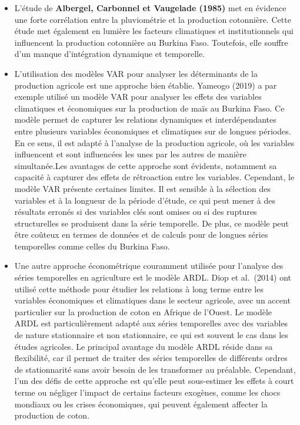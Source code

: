 \documentclass[
  letterpaper,
  DIV=11,
  numbers=noendperiod]{scrartcl}
\begin{document}
\begin{itemize}
\item
  L'étude de \textbf{Albergel, Carbonnel et Vaugelade (1985)} met en
  évidence une forte corrélation entre la pluviométrie et la production
  cotonnière. Cette étude met également en lumière les facteurs
  climatiques et institutionnels qui influencent la production
  cotonnière au Burkina Faso. Toutefois, elle souffre d'un manque
  d'intégration dynamique et temporelle.
\item
  L'utilisation des modèles VAR pour analyser les déterminants de la
  production agricole est une approche bien établie. Yameogo (2019) a
  par exemple utilisé un modèle VAR pour analyser les effets des
  variables climatiques et économiques sur la production de maïs au
  Burkina Faso. Ce modèle permet de capturer les relations dynamiques et
  interdépendantes entre plusieurs variables économiques et climatiques
  sur de longues périodes. En ce sens, il est adapté à l'analyse de la
  production agricole, où les variables influencent et sont influencées
  les unes par les autres de manière simultanée.Les avantages de cette
  approche sont évidents, notamment sa capacité à capturer des effets de
  rétroaction entre les variables. Cependant, le modèle VAR présente
  certaines limites. Il est sensible à la sélection des variables et à
  la longueur de la période d'étude, ce qui peut mener à des résultats
  erronés si des variables clés sont omises ou si des ruptures
  structurelles se produisent dans la série temporelle. De plus, ce
  modèle peut être coûteux en termes de données et de calculs pour de
  longues séries temporelles comme celles du Burkina Faso.
\item
  Une autre approche économétrique couramment utilisée pour l'analyse
  des séries temporelles en agriculture est le modèle ARDL. Diop et
  al.~(2014) ont utilisé cette méthode pour étudier les relations à long
  terme entre les variables économiques et climatiques dans le secteur
  agricole, avec un accent particulier sur la production de coton en
  Afrique de l'Ouest. Le modèle ARDL est particulièrement adapté aux
  séries temporelles avec des variables de nature stationnaire et non
  stationnaire, ce qui est souvent le cas dans les études agricoles. Le
  principal avantage du modèle ARDL réside dans sa flexibilité, car il
  permet de traiter des séries temporelles de différents ordres de
  stationnarité sans avoir besoin de les transformer au préalable.
  Cependant, l'un des défis de cette approche est qu'elle peut
  sous-estimer les effets à court terme ou négliger l'impact de certains
  facteurs exogènes, comme les chocs mondiaux ou les crises économiques,
  qui peuvent également affecter la production de coton.
\end{itemize}
\end{document}
